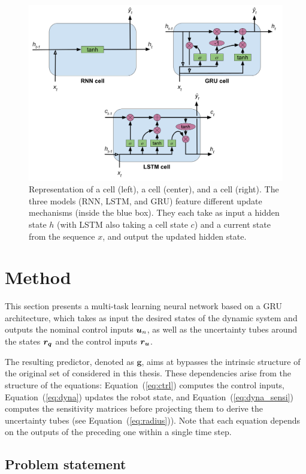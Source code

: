 \begin{figure} [htp]
    \centering
    \includegraphics[width=0.8\linewidth]{figures/learning_quadrotor/cells.png}%
    \caption{Representation of a  cell (left), a  cell (center), and a  cell (right).
    The three models (RNN, LSTM, and GRU) feature different update mechanisms (inside the blue box). They each take as input a hidden state $h$ (with LSTM also taking a cell state $c$) and a current state from the sequence $x$, and output the updated hidden state.
    }%
    \label{fig:rnns}%
\end{figure}

\section{Method} \label{sec:method}

This section presents a multi-task learning neural network based on a GRU architecture, which takes as input the desired states of the dynamic system and outputs the nominal control inputs $\boldsymbol{u}_n$, as well as the uncertainty tubes around the states $\boldsymbol{r_q}$ and the control inputs $\boldsymbol{r_u}$. 

The resulting predictor, denoted as $\boldsymbol{g}$, aims at bypasses the intrinsic structure of the original set of  considered in this thesis. 
These dependencies arise from the structure of the equations: Equation~(\ref{eq:ctrl}) computes the control inputs, Equation~(\ref{eq:dyna}) updates the robot state, and Equation~(\ref{eq:dyna_sensi}) computes the sensitivity matrices before projecting them to derive the uncertainty tubes (see Equation~(\ref{eq:radius})). 
Note that each equation depends on the outputs of the preceding one within a single time step.

\subsection{Problem statement}

